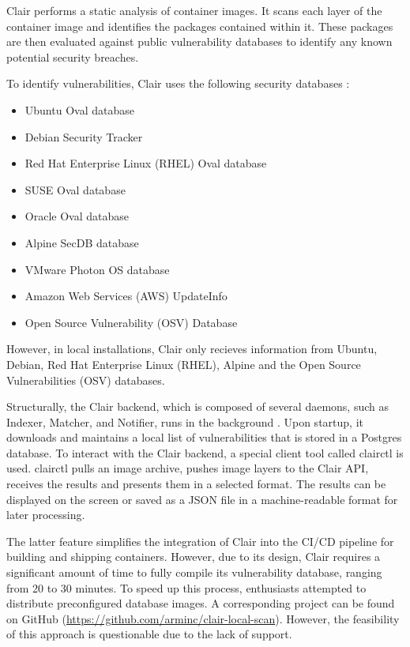 Clair performs a static analysis of container images. It scans each layer of the container image and identifies the packages contained within it. These packages are then evaluated against public vulnerability databases to identify any known potential security breaches. 

To identify vulnerabilities, Clair uses the following security databases \cite{s:clair-intro2}:

\begin{itemize}
    \item Ubuntu Oval database
    \item Debian Security Tracker
    \item Red Hat Enterprise Linux (RHEL) Oval database
    \item SUSE Oval database
    \item Oracle Oval database
    \item Alpine SecDB database
    \item VMware Photon OS database
    \item Amazon Web Services (AWS) UpdateInfo
    \item Open Source Vulnerability (OSV) Database
\end{itemize}

However, in local installations, Clair only recieves information from Ubuntu, Debian, Red Hat Enterprise Linux (RHEL), Alpine and the Open Source Vulnerabilities (OSV) databases.

Structurally, the Clair backend, which is composed of several daemons, such as Indexer, Matcher, and Notifier, runs in the background \cite{d:clairdeployment}. Upon startup, it downloads and maintains a local list of vulnerabilities that is stored in a Postgres database. To interact with the Clair backend, a special client tool called clairctl is used. clairctl pulls an image archive, pushes image layers to the Clair API, receives the results and presents them in a selected format. The results can be displayed on the screen or saved as a JSON file in a machine-readable format for later processing.

The latter feature simplifies the integration of Clair into the CI/CD pipeline for building and shipping containers. However, due to its design, Clair requires a significant amount of time to fully compile its vulnerability database, ranging from 20 to 30 minutes. To speed up this process, enthusiasts attempted to distribute preconfigured database images. A corresponding project can be found on GitHub (\url{https://github.com/arminc/clair-local-scan}). However, the feasibility of this approach is questionable due to the lack of support.

